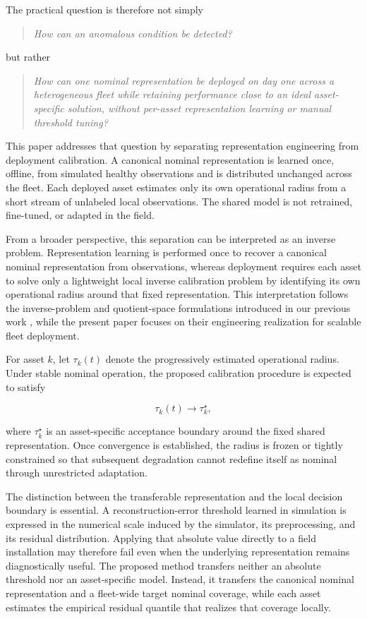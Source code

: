 \documentclass[11pt,a4paper]{article}
\begin{document}
The practical question is therefore not simply

\begin{quote}
\emph{How can an anomalous condition be detected?}
\end{quote}

but rather

\begin{quote}
\emph{How can one nominal representation be deployed on day one across a heterogeneous fleet
while retaining performance close to an ideal asset-specific solution, without per-asset
representation learning or manual threshold tuning?}
\end{quote}

This paper addresses that question by separating representation engineering from deployment
calibration. A canonical nominal representation is learned once, offline, from simulated healthy
observations and is distributed unchanged across the fleet. Each deployed asset estimates only
its own operational radius from a short stream of unlabeled local observations. The shared model
is not retrained, fine-tuned, or adapted in the field.

From a broader perspective, this separation can be interpreted as an inverse problem.
Representation learning is performed once to recover a canonical nominal representation from
observations, whereas deployment requires each asset to solve only a lightweight local inverse
calibration problem by identifying its own operational radius around that fixed representation.
This interpretation follows the inverse-problem and quotient-space formulations introduced in our
previous work \cite{disanti2026inverse,disanti2026quotient}, while the present paper focuses on
their engineering realization for scalable fleet deployment.

For asset $k$, let $\tau_k(t)$ denote the progressively estimated operational radius. Under stable
nominal operation, the proposed calibration procedure is expected to satisfy

\[
\tau_k(t)\rightarrow\tau_k^\star,
\]

where $\tau_k^\star$ is an asset-specific acceptance boundary around the fixed shared
representation. Once convergence is established, the radius is frozen or tightly constrained so
that subsequent degradation cannot redefine itself as nominal through unrestricted adaptation.

The distinction between the transferable representation and the local decision boundary is
essential. A reconstruction-error threshold learned in simulation is expressed in the numerical
scale induced by the simulator, its preprocessing, and its residual distribution. Applying that
absolute value directly to a field installation may therefore fail even when the underlying
representation remains diagnostically useful. The proposed method transfers neither an absolute
threshold nor an asset-specific model. Instead, it transfers the canonical nominal representation
and a fleet-wide target nominal coverage, while each asset estimates the empirical residual
quantile that realizes that coverage locally.
\end{document}
